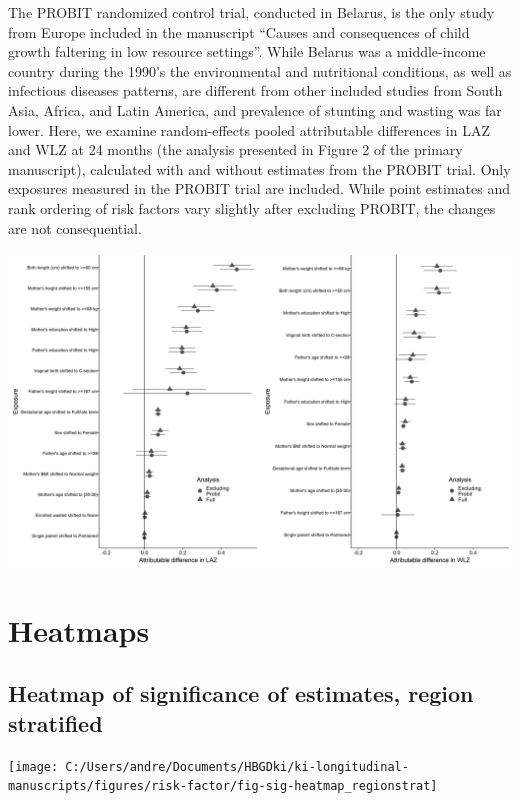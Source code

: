 \documentclass[9pt,]{book}
\begin{document}
The PROBIT randomized control trial, conducted in Belarus, is the only
study from Europe included in the manuscript ``Causes and consequences
of child growth faltering in low resource settings''. While Belarus was
a middle-income country during the 1990's the environmental and
nutritional conditions, as well as infectious diseases patterns, are
different from other included studies from South Asia, Africa, and Latin
America, and prevalence of stunting and wasting was far lower. Here, we
examine random-effects pooled attributable differences in LAZ and WLZ at
24 months (the analysis presented in Figure 2 of the primary
manuscript), calculated with and without estimates from the PROBIT
trial. Only exposures measured in the PROBIT trial are included. While
point estimates and rank ordering of risk factors vary slightly after
excluding PROBIT, the changes are not consequential.

\includegraphics[width=66.67in]{figure-copies/fig-PAR-Probit-sensitivity}

\chapter{Heatmaps}\label{heatmaps}

\raggedright

\section{Heatmap of significance of estimates, region
stratified}\label{heatmap-of-significance-of-estimates-region-stratified}

\texttt{[image: C:/Users/andre/Documents/HBGDki/ki-longitudinal-manuscripts/figures/risk-factor/fig-sig-heatmap\_regionstrat]}
\end{document}
